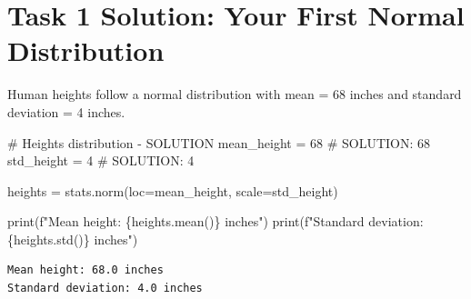 \documentclass[
  letterpaper,
  DIV=11,
  numbers=noendperiod]{scrartcl}
\newenvironment{Shaded}{\begin{snugshade}}{\end{snugshade}}
\newcommand{\BuiltInTok}[1]{\textcolor[rgb]{0.00,0.23,0.31}{#1}}
\newcommand{\CommentTok}[1]{\textcolor[rgb]{0.37,0.37,0.37}{#1}}
\newcommand{\DecValTok}[1]{\textcolor[rgb]{0.68,0.00,0.00}{#1}}
\newcommand{\NormalTok}[1]{\textcolor[rgb]{0.00,0.23,0.31}{#1}}
\newcommand{\OperatorTok}[1]{\textcolor[rgb]{0.37,0.37,0.37}{#1}}
\newcommand{\SpecialCharTok}[1]{\textcolor[rgb]{0.37,0.37,0.37}{#1}}
\newcommand{\SpecialStringTok}[1]{\textcolor[rgb]{0.13,0.47,0.30}{#1}}
\begin{document}
\section{Task 1 Solution: Your First Normal
Distribution}\label{task-1-solution-your-first-normal-distribution}

Human heights follow a normal distribution with mean = 68 inches and
standard deviation = 4 inches.

\begin{Shaded}
\begin{Highlighting}[]
\CommentTok{\# Heights distribution {-} SOLUTION}
\NormalTok{mean\_height }\OperatorTok{=} \DecValTok{68}  \CommentTok{\# SOLUTION: 68}
\NormalTok{std\_height }\OperatorTok{=} \DecValTok{4}    \CommentTok{\# SOLUTION: 4}

\NormalTok{heights }\OperatorTok{=}\NormalTok{ stats.norm(loc}\OperatorTok{=}\NormalTok{mean\_height, scale}\OperatorTok{=}\NormalTok{std\_height)}

\BuiltInTok{print}\NormalTok{(}\SpecialStringTok{f"Mean height: }\SpecialCharTok{\{}\NormalTok{heights}\SpecialCharTok{.}\NormalTok{mean()}\SpecialCharTok{\}}\SpecialStringTok{ inches"}\NormalTok{)}
\BuiltInTok{print}\NormalTok{(}\SpecialStringTok{f"Standard deviation: }\SpecialCharTok{\{}\NormalTok{heights}\SpecialCharTok{.}\NormalTok{std()}\SpecialCharTok{\}}\SpecialStringTok{ inches"}\NormalTok{)}
\end{Highlighting}
\end{Shaded}

\begin{verbatim}
Mean height: 68.0 inches
Standard deviation: 4.0 inches
\end{verbatim}
\end{document}
